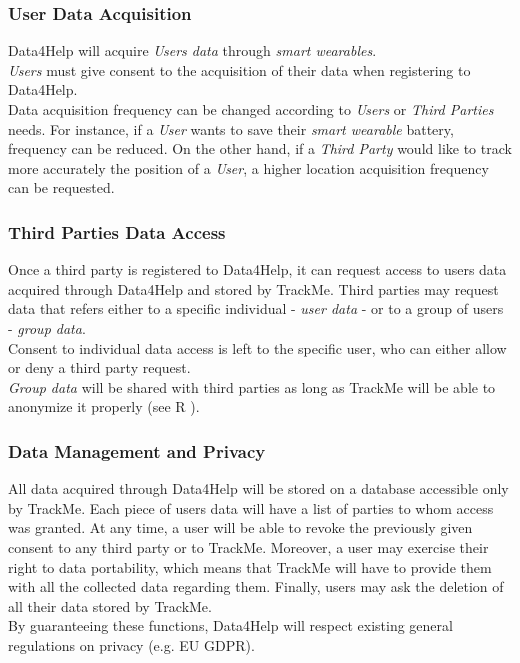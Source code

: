 \documentclass[../../rasd.tex]{subfiles}
\begin{document}
				\subsubsection{User Data Acquisition}
				Data4Help will acquire \textit{Users data} through \textit{smart wearables}. \\
				\textit{Users} must give consent to the acquisition of their data when registering to Data4Help.\\
				Data acquisition frequency can be changed according to \textit{Users} or \textit{Third Parties} needs. For instance, if a \textit{User} wants to save their \textit{smart wearable} battery, frequency can be reduced. On the other hand, if a \textit{Third Party} would like to track more accurately the position of a \textit{User}, a higher location acquisition frequency can be requested.	

				\subsubsection{Third Parties Data Access}
				Once a third party is registered to Data4Help, it can request access to users data acquired through Data4Help and stored by TrackMe. Third parties may request data that refers either to a specific individual - \textit{user data} - or to a group of users - \textit{group data}.\\
				Consent to individual data access is left to the specific user, who can either allow or deny a third party request.\\
				\textit{Group data} will be shared with third parties as long as TrackMe will be able to anonymize it properly (see R ).

				\subsubsection{Data Management and Privacy}
				All data acquired through Data4Help will be stored on a database accessible only by TrackMe. Each piece of users data will have a list of parties to whom access was granted. At any time, a user will be able to revoke the previously given consent to any third party or to TrackMe. Moreover, a user may exercise their right to data portability, which means that TrackMe will have to provide them with all the collected data regarding them. Finally, users may ask the deletion of all their data stored by TrackMe. \\
				By guaranteeing these functions, Data4Help will respect existing general regulations on privacy (e.g. EU GDPR).
			
\end{document}
